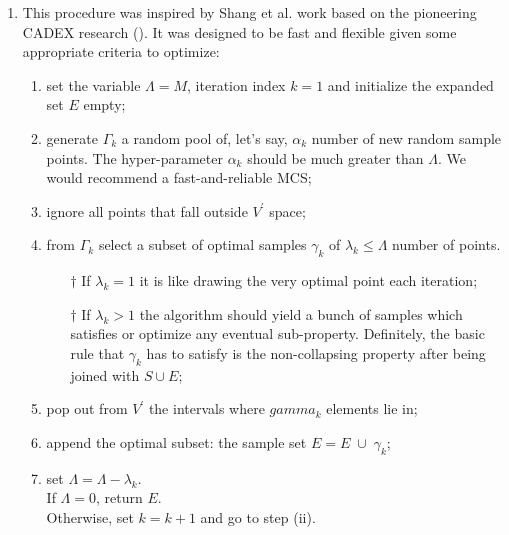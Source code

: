 \documentclass[12pt]{extarticle}
\begin{document}
\begin{enumerate}
\begin{enumerate}
	\item This procedure was inspired by Shang et al. work based on the pioneering CADEX research (). It was designed to be fast and flexible given some appropriate criteria to optimize:
	\begin{enumerate}

		\item set the variable $\Lambda = M$, iteration index $k = 1$ and initialize the expanded set $E$ empty;

		\item generate $\Gamma_k$ a random pool of, let's say, $\alpha_k$ number of new random sample points. The hyper-parameter $\alpha_k$ should be much greater than $\Lambda$. We would recommend a fast-and-reliable MCS;
	
		\item ignore all points that fall outside $V^\prime$ space;

		\item from $\Gamma_k$ select a subset of optimal samples $\gamma_k$ of $\lambda_k \leq \Lambda$ number of points.
	
		\begin{enumerate}
			\item[$\dagger$] If $\lambda_k = 1$ it is like drawing the very optimal point each iteration;
			\item[$\dagger$] If $\lambda_k > 1$ the algorithm should yield a bunch of samples which satisfies or optimize any eventual sub-property. Definitely, the basic rule that $\gamma_k$ has to satisfy is the non-collapsing property after being joined with $S \cup E$;
		\end{enumerate}
	
		\item pop out from $V^\prime$ the intervals where $gamma_k$ elements lie in;
	
		\item append the optimal subset: the sample set $E = E \; \cup \;\gamma_k$;
	
		\item set $\Lambda = \Lambda - \lambda_k$. \\
		If $\Lambda = 0$, return $E$. \\
		Otherwise, set $k = k + 1$ and go to step (ii).

	\end{enumerate}
	

\end{enumerate}
\end{enumerate}
\end{document}
